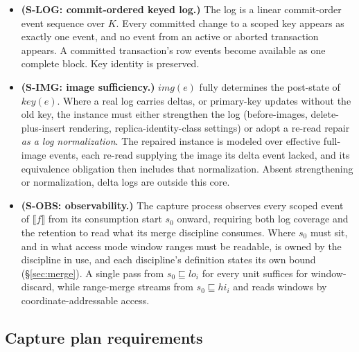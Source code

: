 \documentclass[sigconf,nonacm,10pt]{acmart}
\theoremstyle{plain}
\theoremstyle{definition}
\newcommand{\den}[1]{\llbracket #1 \rrbracket}   %
\newcommand{\pre}{\sqsubseteq}                   %
\newcommand{\keyof}{\mathit{key}}                %
\newcommand{\imgof}{\mathit{img}}                %
\newcommand{\keys}{K}                            %
\begin{document}
\begin{itemize}
\item \textbf{(S-LOG: commit-ordered keyed log.)} The log is a
linear commit-order event sequence over $\keys$. Every committed
change to a scoped key appears as exactly one event, and no event from
an active or aborted transaction appears. A committed transaction's
row events become available as one complete block. Key identity is preserved.
\item \textbf{(S-IMG: image sufficiency.)} $\imgof(e)$ fully
determines the post-state of $\keyof(e)$. Where a real log carries
deltas, or primary-key updates without the old key, the instance
must either strengthen the log (before-images, delete-plus-insert
rendering, replica-identity-class settings) or adopt a re-read
repair \emph{as a log normalization}. The repaired instance is
modeled over effective full-image events, each re-read supplying the
image its delta event lacked, and its equivalence obligation then
includes that normalization. Absent strengthening or normalization,
delta logs are outside this core.
\item \textbf{(S-OBS: observability.)} The capture process
observes every scoped event of $\den{f}$ from its consumption
start $s_0$ onward, requiring both log coverage and
the retention to read what its merge discipline consumes. Where $s_0$ must sit, and
in what access mode window ranges must be readable, is owned by
the discipline in use, and each discipline's definition states its
own bound (\S\ref{sec:merge}). A single pass from $s_0 \pre lo_i$
for every unit suffices for window-discard, while range-merge
streams from $s_0 \pre hi_i$ and reads windows by
coordinate-addressable access.
\end{itemize}

\subsection{Capture plan requirements}\label{sec:contract-obligations}
\end{document}
